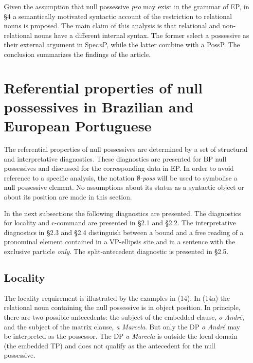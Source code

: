 \documentclass[output=paper]{langsci/langscibook}
\begin{document}
Given the assumption that null possessive \textit{pro} may exist in the grammar of EP, in §4 a semantically motivated syntactic account of the restriction to relational nouns is proposed. The main claim of this analysis is that relational and non-relational nouns have a different internal syntax. The former select a possessive as their external argument in Spec\textit{n}P, while the latter combine with a PossP. The conclusion summarizes the findings of the article.

\section{Referential properties of null possessives in Brazilian and European Portuguese}%

The referential properties of null possessives are determined by a set of structural and interpretative diagnostics. These diagnostics are presented for BP null possessives and discussed for the corresponding data in EP. In order to avoid reference to a specific analysis, the notation \textit{$\emptyset$-poss} will be used to symbolise a null possessive element. No assumptions about its status as a syntactic object or about its position are made in this section.  

In the next subsections the following diagnostics are presented. The diagnostics for locality and c-command are presented in §2.1 and §2.2. The interpretative diagnostics in §2.3 and §2.4 distinguish between a bound and a free reading of a pronominal element contained in a VP-ellipsis site and in a sentence with the exclusive particle \textit{only}. The split-antecedent diagnostic is presented in §2.5.

\subsection{Locality}%

The locality requirement is illustrated by the examples in (14). In (14a) the relational noun containing the null possessive is in object position. In principle, there are two possible antecedents: the subject of the embedded clause, \textit{o André}, and the subject of the matrix clause, \textit{a Marcela}. But only the DP \textit{o André} may be interpreted as the possessor. The DP \textit{a Marcela} is outside the local domain (the embedded TP) and does not qualify as the antecedent for the null possessive. 
\end{document}
